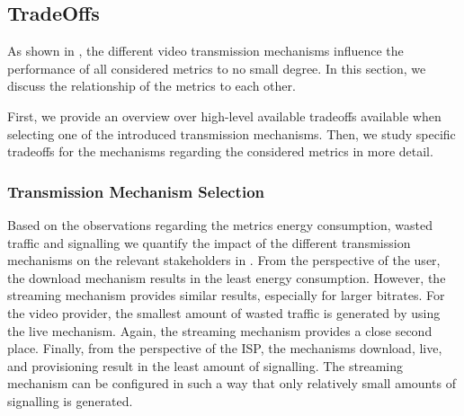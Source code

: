 \subsection{TradeOffs}\label{sec:application:lte_video:trade_offs}
As shown in , the different video transmission mechanisms influence the performance of all considered metrics to no small degree. 
In this section, we discuss the relationship of the metrics to each other.

First, we provide an overview over high-level available tradeoffs available when selecting one of the introduced transmission mechanisms.
Then, we study specific tradeoffs for the \streaming mechanisms regarding the considered metrics in more detail.

\subsubsection*{Transmission Mechanism Selection}\label{sec:application:lte_video:trade_offs:mechanism_selection}

Based on the observations regarding the metrics energy consumption, wasted traffic and signalling we quantify the impact of the different transmission mechanisms on the relevant stakeholders in .
From the perspective of the user, the download mechanism results in the least energy consumption.
However, the streaming mechanism provides similar results, especially for larger bitrates.
For the video provider, the smallest amount of wasted traffic is generated by using the live mechanism.
Again, the streaming mechanism provides a close second place.
Finally, from the perspective of the \gls{ISP}, the mechanisms download, live, and provisioning result in the least amount of signalling.
The streaming mechanism can be configured in such a way that only relatively small amounts of signalling is generated.


